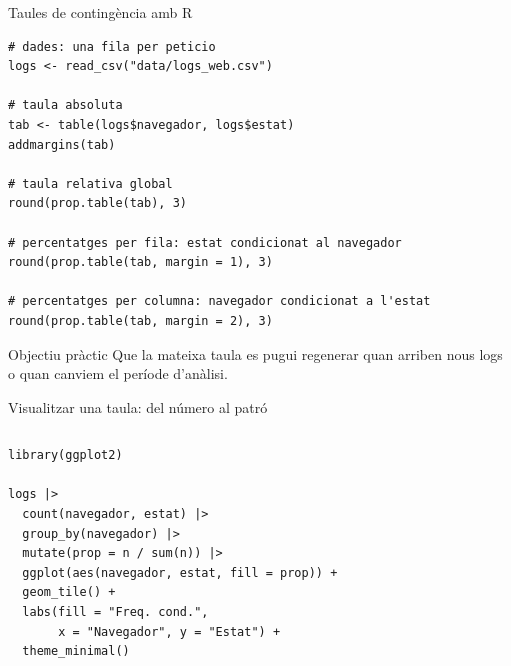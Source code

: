 \documentclass[10pt,aspectratio=169]{beamer}
\begin{document}
\begin{frame}[fragile]{Taules de contingència amb R}
\begin{lstlisting}
# dades: una fila per peticio
logs <- read_csv("data/logs_web.csv")

# taula absoluta
tab <- table(logs$navegador, logs$estat)
addmargins(tab)

# taula relativa global
round(prop.table(tab), 3)

# percentatges per fila: estat condicionat al navegador
round(prop.table(tab, margin = 1), 3)

# percentatges per columna: navegador condicionat a l'estat
round(prop.table(tab, margin = 2), 3)
\end{lstlisting}
\vspace{0.2cm}
\begin{block}{Objectiu pràctic}
Que la mateixa taula es pugui regenerar quan arriben nous logs o quan canviem el període d'anàlisi.
\end{block}
\end{frame}

\begin{frame}[fragile]{Visualitzar una taula: del número al patró}
\begin{columns}[T]
\begin{lstlisting}
library(ggplot2)

logs |>
  count(navegador, estat) |>
  group_by(navegador) |>
  mutate(prop = n / sum(n)) |>
  ggplot(aes(navegador, estat, fill = prop)) +
  geom_tile() +
  labs(fill = "Freq. cond.",
       x = "Navegador", y = "Estat") +
  theme_minimal()
\end{lstlisting}
\centering
{}
\end{columns}
\end{frame}
\end{document}

